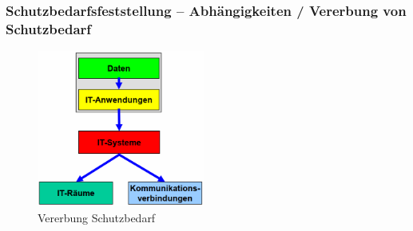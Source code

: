 \documentclass[10pt,a4paper]{article}
\begin{document}

\subsubsection*{Schutzbedarfsfeststellung – Abhängigkeiten / Vererbung von Schutzbedarf}
\begin{figure}[H]
    \begin{center}
    \includegraphics[width=5.5cm]{images/Vererbung Schutzbedarf.png}
    \caption{Vererbung Schutzbedarf}
    \label{Vererbung Schutzbedarf}
    \end{center}
\end{figure}
\end{document}
